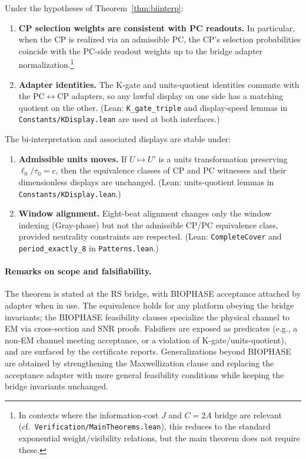 \documentclass[12pt,a4paper]{article}
\begin{document}
\begin{corollary}
\label{cor:weights-readout}
Under the hypotheses of Theorem~\ref{thm:biinterp}:
\begin{enumerate}
  \item \textbf{CP selection weights are consistent with PC readouts.} In particular, when the CP is realized via an admissible PC, the CP’s selection probabilities coincide with the PC-side readout weights up to the bridge adapter normalization.\footnote{In contexts where the information-cost \(J\) and \(C{=}2A\) bridge are relevant (cf.\ \texttt{Verification/MainTheorems.lean}), this reduces to the standard exponential weight/visibility relations, but the main theorem does not require these.}
  \item \textbf{Adapter identities.} The K-gate and units-quotient identities commute with the PC\(\leftrightarrow\)CP adapters, so any lawful display on one side has a matching quotient on the other. (Lean: \texttt{K\_gate\_triple} and display-speed lemmas in \texttt{Constants/KDisplay.lean} are used at both interfaces.)
\end{enumerate}
\end{corollary}

\begin{corollary}
\label{cor:stability}
The bi-interpretation and associated displays are stable under:
\begin{enumerate}
  \item \textbf{Admissible units moves.} If \(U\mapsto U'\) is a units transformation preserving \(\ell_0/\tau_0=c\), then the equivalence classes of CP and PC witnesses and their dimensionless displays are unchanged. (Lean: units-quotient lemmas in \texttt{Constants/KDisplay.lean}.)
  \item \textbf{Window alignment.} Eight-beat alignment changes only the window indexing (Gray-phase) but not the admissible CP/PC equivalence class, provided neutrality constraints are respected. (Lean: \texttt{CompleteCover} and \texttt{period\_exactly\_8} in \texttt{Patterns.lean}.)
\end{enumerate}
\end{corollary}

\paragraph{Remarks on scope and falsifiability.}
The theorem is stated at the RS bridge, with BIOPHASE acceptance attached by adapter when in use. The equivalence holds for any platform obeying the bridge invariants; the BIOPHASE feasibility clauses specialize the physical channel to EM via cross-section and SNR proofs. Falsifiers are exposed as predicates (e.g., a non-EM channel meeting acceptance, or a violation of K-gate/units-quotient), and are surfaced by the certificate reports. Generalizations beyond BIOPHASE are obtained by strengthening the Maxwellization clause and replacing the acceptance adapter with more general feasibility conditions while keeping the bridge invariants unchanged.
\end{document}
